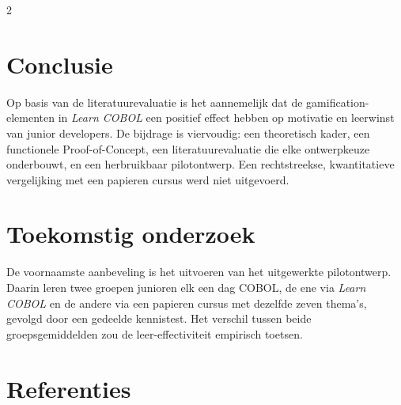 \documentclass[a0,portrait]{hogent-poster}
\renewcommand*{\bibfont}{\scriptsize}
\begin{document}
\begin{multicols}{2}
\section{Conclusie}

Op basis van de literatuurevaluatie is het aannemelijk dat de gamification-elementen in \textit{Learn COBOL} een positief effect hebben op motivatie en leerwinst van junior developers. De bijdrage is viervoudig: een theoretisch kader, een functionele Proof-of-Concept, een literatuurevaluatie die elke ontwerpkeuze onderbouwt, en een herbruikbaar pilotontwerp. Een rechtstreekse, kwantitatieve vergelijking met een papieren cursus werd niet uitgevoerd.

\section{Toekomstig onderzoek}

De voornaamste aanbeveling is het uitvoeren van het uitgewerkte pilotontwerp. Daarin leren twee groepen junioren elk een dag COBOL, de ene via \textit{Learn COBOL} en de andere via een papieren cursus met dezelfde zeven thema's, gevolgd door een gedeelde kennistest. Het verschil tussen beide groepsgemiddelden zou de leer-effectiviteit empirisch toetsen.

\section{Referenties}
\begingroup
\renewcommand*{\bibfont}{\tiny}
\setlength{\bibitemsep}{0pt}
\noindent
\begin{minipage}[t]{0.68\linewidth}
  \printbibliography[heading=none]
\end{minipage}
\endgroup

\end{multicols}
\end{document}
